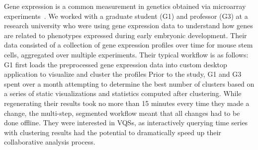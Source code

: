  \par\noindent{} Gene expression is a common measurement in genetics obtained via microarray experiments~\cite{Peng2016}.  We worked with a graduate student (G1) and professor (G3) at a research university who were using gene expression data to understand how genes are related to phenotypes expressed during early embryonic development. Their data consisted of a collection of gene expression profiles over time for mouse stem cells, aggregated over multiple experiments. %
 \npar Their typical workflow is as follows: G1 first loads the preprocessed gene expression data into custom desktop application to  visualize and cluster the profiles
 \npar Prior to the study, G1 and G3 spent over a month attempting to determine the best number of clusters based on a series of static visualizations and statistics computed after clustering. While regenerating their results took no more than 15 minutes every time they made a change, the multi-step, segmented workflow meant that all changes had to be done offline. They were interested in VQSs, as interactively querying time series with clustering results had the potential to dramatically speed up their collaborative analysis process.

